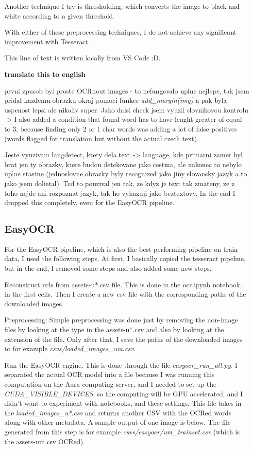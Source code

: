 \documentclass[
  digital,     %
  oneside,     %
  nosansbold,  %
  nocolorbold, %
  nolof,         %
  nolot,         %
]{fithesis4}
\begin{document}
Another technique I try is thresholding, which converts the image to black and white according to a given threshold.

With either of these preprocessing techniques, I do not achieve any significant improvement with Tesseract.

This line of text is written locally from VS Code :D.

\textbf{translate this to english}

prvni zpusob byl proste OCRnout images - to nefungovalo uplne nejlepe, tak jsem pridal kazdemu obrazku okraj pomoci funkce \emph{add\_margin(img)} a pak byla uspenost lepsi ale nikoliv super. Jako dalsi check jsem vyuzil slovnikovou kontrolu -> I also added a condition that found word has to have lenght greater of equal to 3, because finding only 2 or 1 char words was adding a lot of false positives (words flagged for translation but without the actual czech text).

Jeste vyuzivam langdetect, ktery dela text -> language, kde primarni zamer byl brat jen ty obrazky, ktere budou detekovane jako cestina, ale nakonec to nebylo uplne stastne (jednoslovne obrazky byly recognized jako jiny slovansky jazyk a to jako jsem dolietal). Ted to pouzival jen tak, ze kdyz je text tak zmateny, ze z toho nejde ani rozpoznat jazyk, tak ho vyhazuji jako beztextovy. In the end I dropped this completely, even for the EasyOCR pipeline.

\subsection{EasyOCR}

For the EasyOCR pipeline, which is also the best performing pipeline on train data, I used the following steps. At first, I basically copied the tesseract pipeline, but in the end, I removed some steps and also added some new steps.

Reconstruct urls from assets-u*.csv file. This is done in the ocr.ipynb notebook, in the first cells. Then I create a new csv file with the corresponding paths of the downloaded images.

Preprocessing: Simple preprocessing was done just by removing the non-image files by looking at the type in the assets-u*.csv and also by looking at the extension of the file. Only after that, I save the paths of the downloaded images to for example \emph{csvs/loaded\_images\_um.csv}.

Run the EasyOCR engine. This is done through the file \emph{easyocr\_run\_all.py}. I separated the actual OCR model into a file because I was running this computation on the Aura computing server, and I needed to set up the \emph{CUDA\_VISIBLE\_DEVICES}, so the computing will be GPU accelerated, and I didn't want to experiment with notebooks, and these settings. This file takes in the \emph{loaded\_images\_u*.csv} and returns another CSV with the OCRed words along with other metadata. A sample output of one image is below. The file generated from this step is for example \emph{csvs/easyocr/um\_trainset.csv} (which is the assets-um.csv OCRed).
\end{document}
